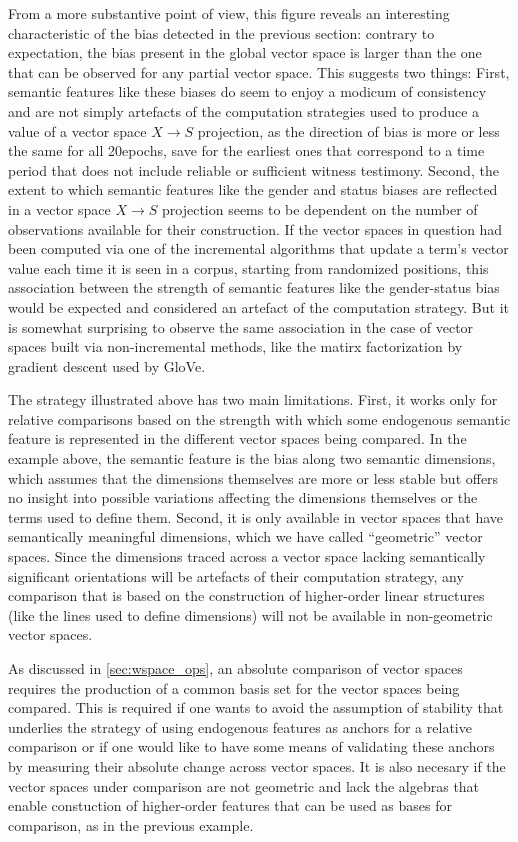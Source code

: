 From a more substantive point of view, this figure reveals an interesting characteristic of the bias detected in the previous section: contrary to expectation, the bias present in the global vector space is larger than the one that can be observed for any partial vector space.
This suggests two things:
First, semantic features like these biases do seem to enjoy a modicum of consistency and are not simply artefacts of the computation strategies used to produce a value of a vector space $X \rightarrow S$ projection, as the direction of bias is more or less the same for all 20epochs, save for the earliest ones that correspond to a time period that does not include reliable or sufficient witness testimony.
Second, the extent to which semantic features like the gender and status biases are reflected in a vector space $X \rightarrow S$ projection seems to be dependent on the number of observations available for their construction.
If the vector spaces in question had been computed via one of the incremental algorithms that update a term's vector value each time it is seen in a corpus, starting from randomized positions, this association between the strength of semantic features like the gender-status bias would be expected and considered an artefact of the computation strategy.
But it is somewhat surprising to observe the same association in the case of vector spaces built via non-incremental methods, like the matirx factorization by gradient descent used by GloVe.

The strategy illustrated above has two main limitations.
First, it works only for relative comparisons based on the strength with which some endogenous semantic feature is represented in the different vector spaces being compared.
In the example above, the semantic feature is the bias along two semantic dimensions, which assumes that the dimensions themselves are more or less stable but offers no insight into possible variations affecting the dimensions themselves or the terms used to define them.
Second, it is only available in vector spaces that have semantically meaningful dimensions, which we have called ``geometric'' vector spaces.
Since the dimensions traced across a vector space lacking semantically significant orientations will be artefacts of their computation strategy, any comparison that is based on the construction of higher-order linear structures (like the lines used to define dimensions) will not be available in non-geometric vector spaces.

As discussed in \autoref{sec:wspace_ops}, an absolute comparison of vector spaces requires the production of a common basis set for the vector spaces being compared.
This is required if one wants to avoid the assumption of stability that underlies the strategy of using endogenous features as anchors for a relative comparison or if one would like to have some means of validating these anchors by measuring their absolute change across vector spaces.
It is also necesary if the vector spaces under comparison are not geometric and lack the algebras that enable constuction of higher-order features that can be used as bases for comparison, as in the previous example.

